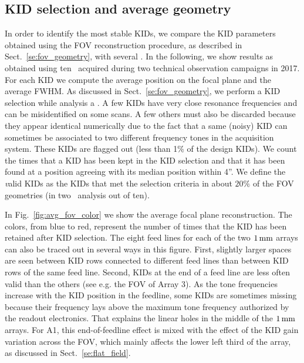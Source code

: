 

\subsection{KID selection and average geometry}
\label{se:avg_kidpar}

In order to identify the most stable KIDs, we compare the KID parameters
obtained using the FOV reconstruction procedure, as described in
Sect.~\ref{se:fov_geometry}, with several \bms. In the following, we
show results as obtained using {\lp ten} \bms\ acquired during two
technical observation campaigns in 2017.
For each KID we compute the average position on the focal plane and
the average FWHM. 
As discussed in Sect.~\ref{se:fov_geometry}, we perform a KID
selection while analysis a \bms. A few KIDs have very close resonance
frequencies and can be misidentified on some scans. A few others must
also be discarded because they appear identical
numerically due to the fact that a same (noisy) KID can sometimes be
associated to two different frequency tones in the acquisition system.
These KIDs are flagged out (less than 1\% of the design KIDs).
{\lp We count the times that a KID has been kept in
the KID selection and that it has been found at a position agreeing
with its median position within 4''.}
We define the {\emph valid} KIDs as the KIDs that met the selection
criteria in about {\lp $20\%$} of the FOV geometries (in two \bm\
analysis out of ten).

In Fig.~\ref{fig:avg_fov_color} we show the average focal plane
reconstruction. The colors, from blue to red,
represent the number of times that the KID has been retained after
KID selection. The eight feed lines for each of the two
$1\,\rm{mm}$ arrays {\lp can also be traced out in several ways} in this
figure. First, slightly larger spaces are seen between KID rows
connected to different feed lines than between KID rows of the same
feed line. Second, KIDs at the end of a feed line are less often valid
than the others
(see e.g. the FOV of Array 3). As the tone frequencies
increase with the KID position in the feedline, some KIDs are
sometimes missing because their frequency lays above the maximum tone
frequency authorized by the readout electronics. That explains the
linear holes in the middle of the $1\,\rm{mm}$ arrays. For A1, this
end-of-feedline effect is mixed with the effect of the KID gain
variation across the FOV, which mainly affects the lower left third of
the array, as discussed in Sect.~\ref{se:flat_field}.

